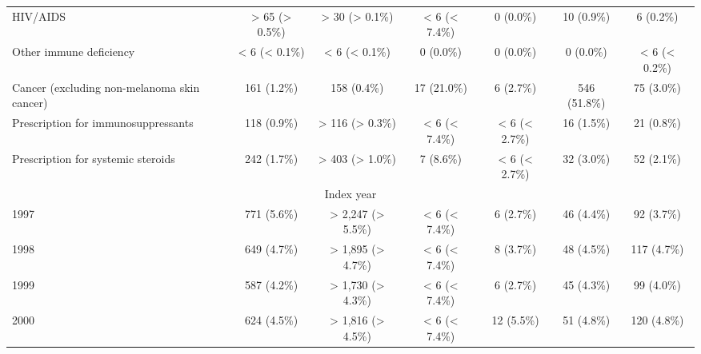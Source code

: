 \documentclass{article}
\begin{document}
\begin{table}[htbp]
\begin{tabular}{l*{6}{c}}
HIV/AIDS                                                &          > 65 (> 0.5\%)         &          > 30 (> 0.1\%)         &          < 6 (< 7.4\%)          &            0 (0.0\%)            &            10 (0.9\%)           &            6 (0.2\%)            \\
Other immune deficiency                                 &          < 6 (< 0.1\%)          &          < 6 (< 0.1\%)          &            0 (0.0\%)            &            0 (0.0\%)            &            0 (0.0\%)            &          < 6 (< 0.2\%)          \\
Cancer (excluding non-melanoma skin cancer)             &           161 (1.2\%)           &           158 (0.4\%)           &           17 (21.0\%)           &            6 (2.7\%)            &           546 (51.8\%)          &            75 (3.0\%)           \\
Prescription for immunosuppressants                     &           118 (0.9\%)           &         > 116 (> 0.3\%)         &          < 6 (< 7.4\%)          &          < 6 (< 2.7\%)          &            16 (1.5\%)           &            21 (0.8\%)           \\
Prescription for systemic steroids                      &           242 (1.7\%)           &         > 403 (> 1.0\%)         &            7 (8.6\%)            &          < 6 (< 2.7\%)          &            32 (3.0\%)           &            52 (2.1\%)           \\
\multicolumn{7}{c}{Index year                                              }\\
  1997                                                  &           771 (5.6\%)           &        > 2,247 (> 5.5\%)        &          < 6 (< 7.4\%)          &            6 (2.7\%)            &            46 (4.4\%)           &            92 (3.7\%)           \\
  1998                                                  &           649 (4.7\%)           &        > 1,895 (> 4.7\%)        &          < 6 (< 7.4\%)          &            8 (3.7\%)            &            48 (4.5\%)           &           117 (4.7\%)           \\
  1999                                                  &           587 (4.2\%)           &        > 1,730 (> 4.3\%)        &          < 6 (< 7.4\%)          &            6 (2.7\%)            &            45 (4.3\%)           &            99 (4.0\%)           \\
  2000                                                  &           624 (4.5\%)           &        > 1,816 (> 4.5\%)        &          < 6 (< 7.4\%)          &            12 (5.5\%)           &            51 (4.8\%)           &           120 (4.8\%)           \\

\end{tabular}
\end{table}
\end{document}
